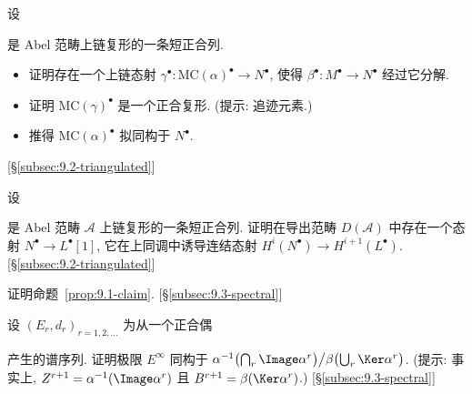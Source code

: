 \begin{prob}\label{ex:9.5}
设
\begin{center}
\end{center}
是 Abel 范畴上链复形的一条短正合列.
\begin{itemize}
\item 证明存在一个上链态射 $\gamma^\bullet:\mathrm{MC}(\alpha)^\bullet\to N^\bullet$, 使得 $\beta^\bullet:M^\bullet\to N^\bullet$ 经过它分解.
\item 证明 $\mathrm{MC}(\gamma)^\bullet$ 是一个正合复形. (提示: 追迹元素.)
\item 推得 $\mathrm{MC}(\alpha)^\bullet$ 拟同构于 $N^\bullet$.
\end{itemize}
[\S\ref{subsec:9.2-triangulated}]
\end{prob}

\begin{prob}\label{ex:9.6}
设
\begin{center}
\end{center}
是 Abel 范畴 $\mathcal{A}$ 上链复形的一条短正合列. 证明在导出范畴 $D(\mathcal{A})$ 中存在一个态射 $N^\bullet\to L^\bullet[1]$, 它在上同调中诱导连结态射 $H^i(N^\bullet)\to H^{i+1}(L^\bullet)$. [\S\ref{subsec:9.2-triangulated}]
\end{prob}

\begin{prob}\label{ex:9.7}
证明命题~\ref{prop:9.1-claim}. [\S\ref{subsec:9.3-spectral}]
\end{prob}

\begin{prob}\label{ex:9.8}
设 $(E_r,d_r)_{r=1,2,\dots}$ 为从一个正合偶
\begin{center}
\end{center}
产生的谱序列. 证明极限 $E^\infty$ 同构于 $\alpha^{-1}\bigl(\bigcap_r\Image\alpha^r\bigr)\big/\beta\bigl(\bigcup_r\Ker\alpha^r\bigr)$. (提示: 事实上, $Z^{r+1}=\alpha^{-1}(\Image\alpha^r)$ 且 $B^{r+1}=\beta(\Ker\alpha^r)$.) [\S\ref{subsec:9.3-spectral}]
\end{prob}

